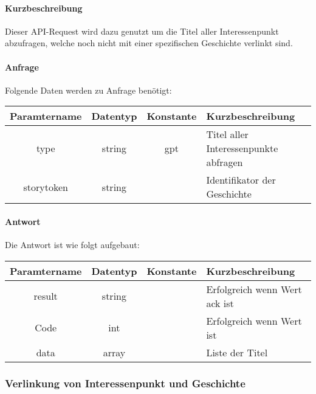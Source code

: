 \paragraph{Kurzbeschreibung}Dieser API-Request wird dazu genutzt um die Titel aller Interessenpunkt abzufragen, welche noch nicht mit einer spezifischen Geschichte verlinkt sind.
\paragraph{Anfrage}Folgende Daten werden zu Anfrage benötigt:
\begin{table}[H]
	\begin{tabular}{|c|c|c|p{6.5cm}|}
		\hline
		\textbf{Paramtername} & \textbf{Datentyp} & \textbf{Konstante} & \textbf{Kurzbeschreibung}                                                                                               \\ \hline
		type                & string            & gpt                & Titel aller Interessenpunkte abfragen\\ \hline
		storytoken          & string            &                    & Identifikator der Geschichte \\ \hline
	\end{tabular}
\end{table}
\paragraph{Antwort}Die Antwort ist wie folgt aufgebaut:
\begin{table}[H]
	\begin{tabular}{|c|c|c|p{6.5cm}|}
		\hline
		\textbf{Paramtername} & \textbf{Datentyp} & \textbf{Konstante} & \textbf{Kurzbeschreibung}                                                                                               \\ \hline
		result              & string           &                 & Erfolgreich wenn Wert {\glqq ack\grqq} ist \\ \hline
		Code                & int              &                 & Erfolgreich wenn Wert {\glqq 0\grqq} ist \\ \hline
		data                & array            &                 & Liste der Titel \\ \hline
	\end{tabular}
\end{table}
\subsubsection{Verlinkung von Interessenpunkt und Geschichte}
